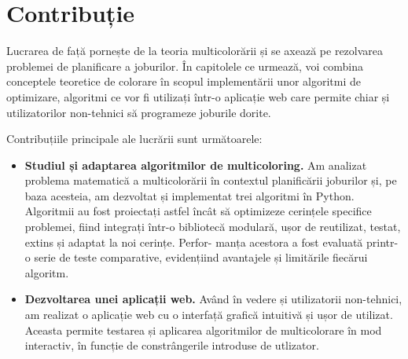 \chapter*{Contribuție}


Lucrarea de față pornește de la teoria multicolorării și se axează pe rezolvarea problemei de planificare a joburilor. În capitolele ce urmează, voi combina conceptele teoretice de colorare în scopul implementării unor algoritmi de optimizare, algoritmi ce vor fi utilizați într-o aplicație web care permite chiar și utilizatorilor non-tehnici să programeze joburile dorite.

Contribuțiile principale ale lucrării sunt următoarele:
\begin{itemize}
\item {\bf Studiul și adaptarea algoritmilor de multicoloring.} Am analizat problema matematică a multicolorării în contextul planificării joburilor și, pe baza acesteia, am dezvoltat și implementat trei algoritmi în Python. Algoritmii au fost proiectați astfel încât să optimizeze cerințele specifice problemei, fiind integrați într-o bibliotecă modulară, ușor de reutilizat, testat, extins și adaptat la noi cerințe. Perfor- manța acestora a fost evaluată printr-o serie de teste comparative, evidențiind avantajele și limitările fiecărui algoritm.

\item {\bf Dezvoltarea unei aplicații web.} Având în vedere și utilizatorii non-tehnici, am realizat o aplicație web cu o interfață grafică intuitivă și ușor de utilizat. Aceasta permite testarea și aplicarea algoritmilor de multicolorare în mod interactiv, în funcție de constrângerile introduse de utlizator.
\end{itemize}